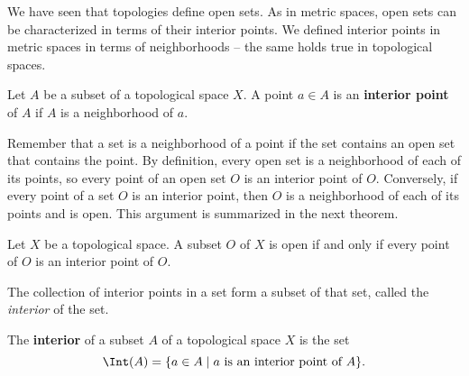 \label{chap:Interiors_topology}


\vspace*{-17 pt}
\framebox{
\parbox{\dimexpr\linewidth-3\fboxsep-3\fboxrule}
{\begin{fqs}
\item 

\end{fqs}}}%

\vspace*{13 pt}

\label{sec_inter_top_intro}
We have seen that topologies define open sets. As in metric spaces, open sets can be characterized in terms of their interior points. We defined interior points in metric spaces in terms of neighborhoods -- the same holds true in topological spaces. 

\begin{definition} Let $A$ be a subset of a topological space $X$. A point $a \in A$ is an \textbf{interior point} of $A$ if $A$ is a neighborhood of $a$.
\end{definition}

Remember that a set is a neighborhood of a point if the set contains an open set that contains the point. By definition, every open set is a neighborhood of each of its points, so every point of an open set $O$ is an interior point of $O$. Conversely, if every point of a set $O$ is an interior point, then $O$ is a neighborhood of each of its points and is open. This argument is summarized in the next theorem. 

\begin{theorem} Let $X$ be a topological space. A subset $O$ of $X$ is open if and only if every point of $O$ is an interior point of $O$. 
\end{theorem}

The collection of interior points in a set form a subset of that set, called the \emph{interior} of the set.

\begin{definition} The \textbf{interior} of a subset $A$ of a topological space $X$ is the set
\[\Int(A) = \{a \in A \mid a \text{ is an interior point of } A\}.\]
\end{definition}

